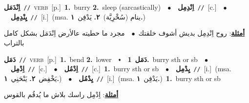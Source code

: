 \documentclass[10pt,a4paper,twoside]{article} %
\begin{document}
\begin{multicols}{2}
{\setlength\topsep{0pt}\textbf{\foreignlanguage{arabic}{اِنْدَمَل}}\ {\color{gray}\texttt{//}\color{black}}\ \textsc{verb}\ [p.]\ \textbf{1.}~burry  \textbf{2.}~sleep (sarcastically)\ \ $\bullet$\ \ \setlength\topsep{0pt}\textbf{\foreignlanguage{arabic}{اِنْدِمِل}}\ {\color{gray}\texttt{//}\color{black}}\ [c.]\ \ $\bullet$\ \ \setlength\topsep{0pt}\textbf{\foreignlanguage{arabic}{يِنْدِمِل}}\ {\color{gray}\texttt{//}\color{black}}\ [i.]\ \color{gray}(msa. \foreignlanguage{arabic}{ينام (سُخْرِيَّة)}~\foreignlanguage{arabic}{\textbf{٢.}}  \foreignlanguage{arabic}{يَدْفِن}~\foreignlanguage{arabic}{\textbf{١.}})\color{black}\  \begin{flushright}\color{gray}\foreignlanguage{arabic}{\textbf{\underline{\foreignlanguage{arabic}{أمثلة}}}: روح اِنْدِمِل بديش أشوف خلقتك\ $\bullet$\ \  مجرد ما حطيته عالأرض اِنْدَمَل بشكل كامل بالتراب}\end{flushright}\color{black}} \vspace{2mm}

{\setlength\topsep{0pt}\textbf{\foreignlanguage{arabic}{دَمَل}}\ {\color{gray}\texttt{//}\color{black}}\ \textsc{verb}\ [p.]\ \textbf{1.}~bend  \textbf{2.}~lower\ \ $\smblkdiamond$\ \ \setlength\topsep{0pt}\textbf{\foreignlanguage{arabic}{دَمَل}}\ \textbf{1.}~burry sth or sb\ \ $\bullet$\ \ \setlength\topsep{0pt}\textbf{\foreignlanguage{arabic}{اِدْمِل}}\ {\color{gray}\texttt{//}\color{black}}\ [c.]\ \ $\bullet$\ \ \setlength\topsep{0pt}\textbf{\foreignlanguage{arabic}{اِدْمُل}}\ {\color{gray}\texttt{//}\color{black}}\ [c.]\ \textbf{1.}~burry sth or sb\ \ $\bullet$\ \ \setlength\topsep{0pt}\textbf{\foreignlanguage{arabic}{يِدْمِل}}\ {\color{gray}\texttt{//}\color{black}}\ [i.]\ \color{gray}(msa. \foreignlanguage{arabic}{يَخْفِض}~\foreignlanguage{arabic}{\textbf{٢.}}  \foreignlanguage{arabic}{يَنْحَنِي}~\foreignlanguage{arabic}{\textbf{١.}})\color{black}\ \ $\bullet$\ \ \setlength\topsep{0pt}\textbf{\foreignlanguage{arabic}{يِدْمُل}}\ {\color{gray}\texttt{//}\color{black}}\ [i.]\ \color{gray}(msa. \foreignlanguage{arabic}{يَدْفِن}~\foreignlanguage{arabic}{\textbf{١.}})\color{black}\ \textbf{1.}~burry sth or sb\  \begin{flushright}\color{gray}\foreignlanguage{arabic}{\textbf{\underline{\foreignlanguage{arabic}{أمثلة}}}: اِدْمِل راسك بلاش ما يُدقُم بالقوس}\end{flushright}\color{black}} \vspace{2mm}


\end{multicols}
\end{document}
